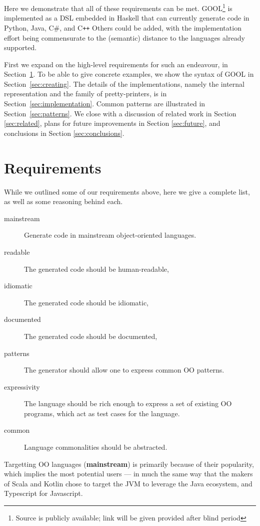 \documentclass[sigplan,review,anonymous,prologue,dvipsnames]{acmart}
\newcommand{\Csharp}{C\#}
\newcommand{\Cplusplus}{C\texttt{++}}
\newcommand{\abbrev}[1]{\textbf{#1}}
\newcommand{\mainstream}{\abbrev{mainstream}}
\begin{document}
Here we demonstrate that all of these requirements can be met.
GOOL\footnote{Source is publicly available; link will be
given provided after blind period}
is implemented as a DSL embedded in Haskell that
can currently generate code in Python, Java, \Csharp, and \Cplusplus%
Others could be added, with the implementation effort being commensurate to the
(semantic) distance to the languages already supported.

First we expand on the high-level requirements for such an endeavour, in
Section~\ref{sec:req}.  To be able to give concrete examples, we
show the syntax of GOOL in Section~\ref{sec:creating}. The details of
the implementations, namely the internal representation and the
family of pretty-printers, is in Section~\ref{sec:implementation}.
Common patterns are illustrated in Section~\ref{sec:patterns}.  We
close with a discussion of related work in Section \ref{sec:related}, plans for
future improvements in Section \ref{sec:future}, and conclusions in Section
\ref{sec:conclusions}.

\section{Requirements} \label{sec:req}

While we outlined some of our requirements above, here we give a
complete list, as well as some reasoning behind each.

\begin{description}
\item[mainstream] Generate code in mainstream object-oriented languages.
\item[readable] The generated code should be human-readable,
\item[idiomatic] The generated code should be idiomatic,
\item[documented] The generated code should be documented,
\item[patterns] The generator should allow one to express common OO patterns.
\item[expressivity] The language should be rich enough to express a
set of existing OO programs, which act as test cases for the language.
\item[common] Language commonalities should be abstracted.
\end{description}

Targetting OO languages (\mainstream) is primarily because of their popularity,
which implies the most potential users --- in much the same way that the makers
of Scala and Kotlin chose to target the JVM to leverage the Java ecosystem, and
Typescript for Javascript.
\end{document}
